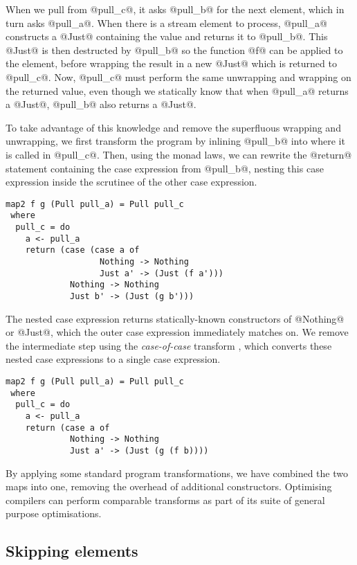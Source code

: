 When we pull from @pull_c@, it asks @pull_b@ for the next element, which in turn asks @pull_a@.
When there is a stream element to process, @pull_a@ constructs a @Just@ containing the value and returns it to @pull_b@.
This @Just@ is then destructed by @pull_b@ so the function @f@ can be applied to the element, before wrapping the result in a new @Just@ which is returned to @pull_c@.
Now, @pull_c@ must perform the same unwrapping and wrapping on the returned value, even though we statically know that when @pull_a@ returns a @Just@, @pull_b@ also returns a @Just@.

To take advantage of this knowledge and remove the superfluous wrapping and unwrapping, we first transform the program by inlining @pull_b@ into where it is called in @pull_c@.
Then, using the monad laws, we can rewrite the @return@ statement containing the case expression from @pull_b@, nesting this case expression inside the scrutinee of the other case expression.

\begin{lstlisting}
map2 f g (Pull pull_a) = Pull pull_c
 where
  pull_c = do
    a <- pull_a
    return (case (case a of
                   Nothing -> Nothing
                   Just a' -> (Just (f a')))
             Nothing -> Nothing
             Just b' -> (Just (g b')))
\end{lstlisting}

The nested case expression returns statically-known constructors of @Nothing@ or @Just@, which the outer case expression immediately matches on.
We remove the intermediate step using the \emph{case-of-case} transform \cite{jones1998transformation}, which converts these nested case expressions to a single case expression.


\begin{lstlisting}
map2 f g (Pull pull_a) = Pull pull_c
 where
  pull_c = do
    a <- pull_a
    return (case a of
             Nothing -> Nothing
             Just a' -> (Just (g (f b))))
\end{lstlisting}

By applying some standard program transformations, we have combined the two maps into one, removing the overhead of additional constructors.
Optimising compilers can perform comparable transforms as part of its suite of general purpose optimisations.

\subsection{Skipping elements}

